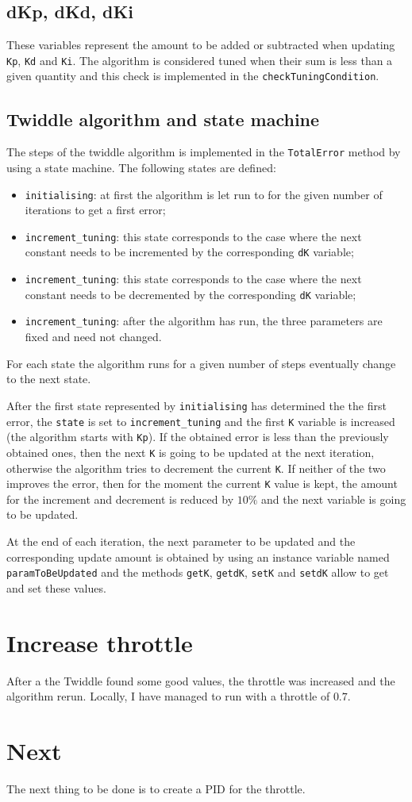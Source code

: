 \documentclass{article}
\let\cd\lstinline
\begin{document}
\subsection{dKp, dKd, dKi}
These variables represent the amount to be added or subtracted when updating \cd+Kp+, \cd+Kd+ and \cd+Ki+. The algorithm is considered tuned when their sum is less than a given quantity and this check is implemented in the \cd+checkTuningCondition+.

\subsection{Twiddle algorithm and state machine}
The steps of the twiddle algorithm is implemented in the \cd+TotalError+ method by using a state machine. The following states are defined:
\begin{itemize}
\item \cd+initialising+: at first the algorithm is let run to for the given number of iterations to get a first error;
\item \cd+increment_tuning+: this state corresponds to the case where the next constant needs to be incremented by the corresponding \cd+dK+ variable;
\item \cd+increment_tuning+: this state corresponds to the case where the next constant needs to be decremented by the corresponding \cd+dK+ variable;
\item \cd+increment_tuning+: after the algorithm has run, the three parameters are fixed and need not changed.
\end{itemize}
For each state the algorithm runs for a given number of steps eventually change to the next state.

After the first state represented by \cd+initialising+ has determined the the first error, the \cd+state+ is set to \cd+increment_tuning+ and the first \cd+K+ variable is increased (the algorithm starts with \cd+Kp+). If the obtained error is less than the previously obtained ones, then the next \cd+K+ is going to be updated at the next iteration, otherwise the algorithm tries to decrement the current \cd+K+. If neither of the two improves the error, then for the moment the current \cd+K+ value is kept, the amount for the increment and decrement is reduced by $10\%$ and the next variable is going to be updated.

At the end of each iteration, the next parameter to be updated and the corresponding update amount is obtained by using an instance variable named \cd+paramToBeUpdated+ and the methods \cd+getK+, \cd+getdK+, \cd+setK+ and \cd+setdK+ allow to get and set these values.

\section{Increase throttle}
After a the Twiddle found some good values, the throttle was increased and the algorithm rerun. Locally, I have managed to run with a throttle of $0.7$.

\section{Next}
The next thing to be done is to create a PID for the throttle.
\end{document}
